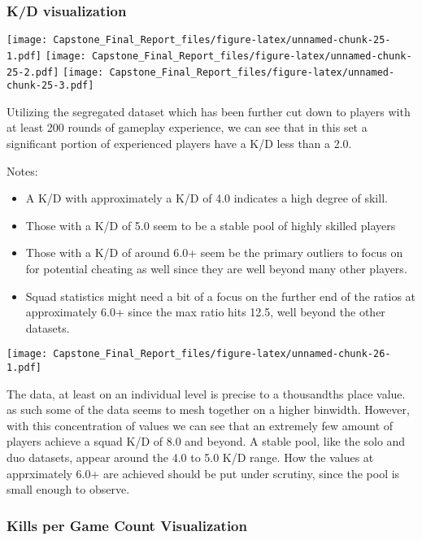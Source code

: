 \documentclass[]{article}
\providecommand{\tightlist}{%
  \setlength{\itemsep}{0pt}\setlength{\parskip}{0pt}}
\begin{document}
\subsubsection{K/D visualization}\label{kd-visualization}

\texttt{[image: Capstone\_Final\_Report\_files/figure-latex/unnamed-chunk-25-1.pdf]}
\texttt{[image: Capstone\_Final\_Report\_files/figure-latex/unnamed-chunk-25-2.pdf]}
\texttt{[image: Capstone\_Final\_Report\_files/figure-latex/unnamed-chunk-25-3.pdf]}

Utilizing the segregated dataset which has been further cut down to
players with at least 200 rounds of gameplay experience, we can see that
in this set a significant portion of experienced players have a K/D less
than a 2.0.

Notes:

\begin{itemize}
\tightlist
\item
  A K/D with approximately a K/D of 4.0 indicates a high degree of
  skill.
\item
  Those with a K/D of 5.0 seem to be a stable pool of highly skilled
  players
\item
  Those with a K/D of around 6.0+ seem be the primary outliers to focus
  on for potential cheating as well since they are well beyond many
  other players.
\item
  Squad statistics might need a bit of a focus on the further end of the
  ratios at approximately 6.0+ since the max ratio hits 12.5, well
  beyond the other datasets.
\end{itemize}

\texttt{[image: Capstone\_Final\_Report\_files/figure-latex/unnamed-chunk-26-1.pdf]}

The data, at least on an individual level is precise to a thousandths
place value. as such some of the data seems to mesh together on a higher
binwidth. However, with this concentration of values we can see that an
extremely few amount of players achieve a squad K/D of 8.0 and beyond. A
stable pool, like the solo and duo datasets, appear around the 4.0 to
5.0 K/D range. How the values at apprximately 6.0+ are achieved should
be put under scrutiny, since the pool is small enough to observe.

\subsubsection{Kills per Game Count
Visualization}\label{kills-per-game-count-visualization}
\end{document}
